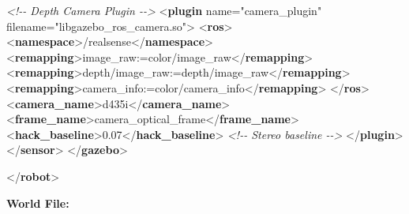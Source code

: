\documentclass[
]{article}
\newenvironment{Shaded}{\begin{snugshade}}{\end{snugshade}}
\newcommand{\CommentTok}[1]{\textcolor[rgb]{0.56,0.35,0.01}{\textit{#1}}}
\newcommand{\KeywordTok}[1]{\textcolor[rgb]{0.13,0.29,0.53}{\textbf{#1}}}
\newcommand{\NormalTok}[1]{#1}
\newcommand{\OtherTok}[1]{\textcolor[rgb]{0.56,0.35,0.01}{#1}}
\newcommand{\StringTok}[1]{\textcolor[rgb]{0.31,0.60,0.02}{#1}}
\begin{document}
\begin{Shaded}
\begin{Highlighting}[]
      \CommentTok{\textless{}!{-}{-} Depth Camera Plugin {-}{-}\textgreater{}}
\NormalTok{      \textless{}}\KeywordTok{plugin}\OtherTok{ name=}\StringTok{"camera\_plugin"}\OtherTok{ filename=}\StringTok{"libgazebo\_ros\_camera.so"}\NormalTok{\textgreater{}}
\NormalTok{        \textless{}}\KeywordTok{ros}\NormalTok{\textgreater{}}
\NormalTok{          \textless{}}\KeywordTok{namespace}\NormalTok{\textgreater{}/realsense\textless{}/}\KeywordTok{namespace}\NormalTok{\textgreater{}}
\NormalTok{          \textless{}}\KeywordTok{remapping}\NormalTok{\textgreater{}image\_raw:=color/image\_raw\textless{}/}\KeywordTok{remapping}\NormalTok{\textgreater{}}
\NormalTok{          \textless{}}\KeywordTok{remapping}\NormalTok{\textgreater{}depth/image\_raw:=depth/image\_raw\textless{}/}\KeywordTok{remapping}\NormalTok{\textgreater{}}
\NormalTok{          \textless{}}\KeywordTok{remapping}\NormalTok{\textgreater{}camera\_info:=color/camera\_info\textless{}/}\KeywordTok{remapping}\NormalTok{\textgreater{}}
\NormalTok{        \textless{}/}\KeywordTok{ros}\NormalTok{\textgreater{}}
\NormalTok{        \textless{}}\KeywordTok{camera\_name}\NormalTok{\textgreater{}d435i\textless{}/}\KeywordTok{camera\_name}\NormalTok{\textgreater{}}
\NormalTok{        \textless{}}\KeywordTok{frame\_name}\NormalTok{\textgreater{}camera\_optical\_frame\textless{}/}\KeywordTok{frame\_name}\NormalTok{\textgreater{}}
\NormalTok{        \textless{}}\KeywordTok{hack\_baseline}\NormalTok{\textgreater{}0.07\textless{}/}\KeywordTok{hack\_baseline}\NormalTok{\textgreater{}  }\CommentTok{\textless{}!{-}{-} Stereo baseline {-}{-}\textgreater{}}
\NormalTok{      \textless{}/}\KeywordTok{plugin}\NormalTok{\textgreater{}}
\NormalTok{    \textless{}/}\KeywordTok{sensor}\NormalTok{\textgreater{}}
\NormalTok{  \textless{}/}\KeywordTok{gazebo}\NormalTok{\textgreater{}}

\NormalTok{\textless{}/}\KeywordTok{robot}\NormalTok{\textgreater{}}
\end{Highlighting}
\end{Shaded}

\textbf{World File:}
\end{document}
